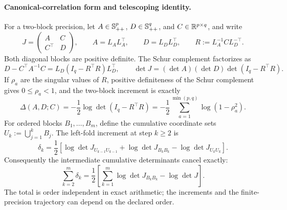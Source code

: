 \paragraph{Canonical-correlation form and telescoping identity.}
For a two-block precision, let $A\in\mathbb S_{++}^{p}$,
$D\in\mathbb S_{++}^{q}$, and $C\in\mathbb R^{p\times q}$, and write
\begin{equation}
J=\begin{pmatrix}A&C\\C^\top&D\end{pmatrix},
\qquad
A=L_A L_A^\top,
\qquad
D=L_D L_D^\top,
\qquad
R:=L_A^{-1}C L_D^{-\top}.
\label{eq:restrict-canonical-correlation-factor}
\end{equation}
Both diagonal blocks are positive definite.  The Schur complement factorizes as
\begin{equation}
D-C^\top A^{-1}C
=L_D\left(I_q-R^\top R\right)L_D^\top,
\qquad
\det J=(\det A)(\det D)\det\left(I_q-R^\top R\right).
\label{eq:restrict-stable-schur-factor}
\end{equation}
If $\rho_a$ are the singular values of $R$, positive definiteness of the
Schur complement gives $0\leq\rho_a<1$, and the two-block increment is exactly
\begin{equation}
\Delta(A,D;C)
=-\frac12\log\det\left(I_q-R^\top R\right)
=-\frac12\sum_{a=1}^{\min(p,q)}\log\left(1-\rho_a^2\right).
\label{eq:restrict-canonical-correlation-gap}
\end{equation}
For ordered blocks $B_1,\ldots,B_m$, define the cumulative coordinate sets
$U_k:=\bigcup_{j=1}^{k}B_j$.  The left-fold increment at step $k\geq2$ is
\begin{equation}
\delta_k
=\frac12\left[
\log\det J_{U_{k-1}U_{k-1}}
+\log\det J_{B_kB_k}
-\log\det J_{U_kU_k}
\right].
\label{eq:restrict-cumulative-gap-increment}
\end{equation}
Consequently the intermediate cumulative determinants cancel exactly:
\begin{equation}
\sum_{k=2}^{m}\delta_k
=\frac12\left[
\sum_{k=1}^{m}\log\det J_{B_kB_k}-\log\det J
\right].
\label{eq:restrict-cumulative-gap-telescope}
\end{equation}
The total is order independent in exact arithmetic; the increments and the
finite-precision trajectory can depend on the declared order.

